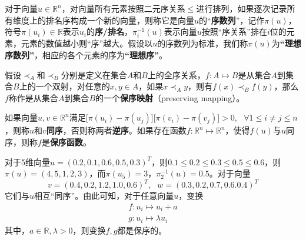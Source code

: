 \begin{definition}[排列]
\end{definition}

\begin{definition}[偏好关系]%
\end{definition}

\begin{definition}[实数排列]
对于向量$u\in \mathbb R^n$，对向量所有元素按照二元序关系$\le$进行排列，如果逐次记录所有维度上的排名序构成一个新的向量，则称它是向量$u$的“\textbf{序数列}”，记作$\pi(u)$，符号$\pi(u_i)\in \mathbb{R}$表示$u_i$的\textbf{序/排名}，$\pi_i^{-1}(u)$表示向量$u$按照“序关系”排在$i$位的元素，元素的数值越小则“序”越大。假设以$u$的序数列为标准，我们称$\pi(u)$为\textbf{“理想序数列”}，相应的各个元素的序为\textbf{“理想序”}。
\end{definition}

\begin{definition}[保序映射]
假设$\prec_A$和$\prec_B$分别是定义在集合$A$和$B$上的全序关系，$f:A\mapsto B$是从集合$A$到集合$B$上的一个双射，对任意的$x,y\in A$，如果$x\prec_A y$，则有$f(x)\prec_B f(y)$，那么$f$称作是从集合$A$到集合$B$的一个\textbf{保序映射}（preserving mapping）。
\end{definition}

\begin{definition}
如果向量$u,v\in \mathbb R^n$满足$\big[\pi(u_i)-\pi(u_j)\big]\big[\pi(v_i)-\pi(v_j)\big]>0,~~~\forall 1\le i\ne j\le n$，则称$u$和$v$\textbf{同序}，否则称两者\textbf{逆序}。如果存在函数$f:\mathbb{R}^n \mapsto \mathbb{R}^n$，使得$f(u)$与$u$同序，则称$f$是\textbf{保序函数}。
\end{definition}

\begin{example}
对于5维向量$u=(0.2,0.1,0.6,0.5,0.3)^T$，则$0.1\le 0.2\le 0.3\le 0.5\le 0.6$，则$\pi(u)=(4,5,1,2,3)$，而$\pi(u_5)=3$，$\pi_2^{-1}(u)=0.5$。对于向量
\[
    v=(0.4,0.2,1.2,1.0,0.6)^T, ~~~w=(0.3,0.2,0.7,0.6.0.4)^T
\]
它们与$u$相互“同序”。由此可知，对于任意向量$u$，变换
\[
    \begin{array}{l}
      f:u_i \mapsto u_i + a \\
      g:u_i \mapsto \lambda u_i
    \end{array}
\]
其中，$a\in \mathbb{R}, \lambda>0$，则变换$f,g$都是保序的。
\end{example}

